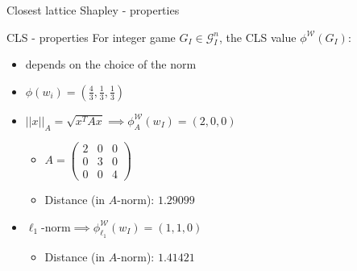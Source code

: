 \documentclass{beamer}
\begin{document}
\begin{frame}{Closest lattice Shapley - properties}
    \pause

    \begin{block}{CLS - properties}
        For integer game $G_I \in \mathcal{G}_I^n$, the CLS value $\phi^\mathcal{W}(G_I)$:
        \begin{itemize}
            \item depends on the choice of the norm
        \end{itemize}
    \end{block}

    \pause

    \begin{itemize}
        \item $\phi(w_i) = (\frac{4}{3},\frac{1}{3},\frac{1}{3})$
        \pause
        \item $||x||_A=\sqrt{x^T A x}\implies \phi^\mathcal{W}_A(w_I) = (2,0,0)$
        \begin{itemize}
            \pause
            \item $A = \begin{pmatrix}
            2 & 0 & 0 \\
            0 & 3 & 0 \\
            0 & 0 & 4
        \end{pmatrix}$
        \pause
        \item Distance (in $A$-norm): $1.29099$
        \end{itemize}
        \pause
        \item $\ell_1$-norm$\implies \phi^\mathcal{W}_{\ell_1}(w_I) = (1,1,0)$
        \begin{itemize}
            \pause
            \item Distance (in $A$-norm): $1.41421$
        \end{itemize}
    \end{itemize}
\end{frame}


\end{document}
